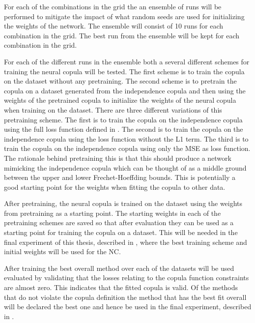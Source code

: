 For each of the combinations in the grid the an ensemble of runs will be performed to mitigate the impact of what random seeds are used for initializing the weights of the network. The ensemble will consist of 10 runs for each combination in the grid. The best run from the ensemble will be kept for each combination in the grid. 

For each of the different runs in the ensemble both a several different schemes for training the neural copula will be tested. The first scheme is to train the copula on the dataset without any pretraining. The second scheme is to pretrain the copula on a dataset generated from the independence copula and then using the weights of the pretrained copula to initialize the weights of the neural copula when training on the dataset. There are three different variations of this pretraining scheme. The first is to train the copula on the independence copula using the full loss function defined in . The second is to train the copula on the independence copula using the loss function without the L1 term. The third is to train the copula on the independence copula using only the MSE as loss function. The rationale behind pretraining this is that this should produce a network mimicking the independence copula which can be thought of as a middle ground between the upper and lower Frechet-Hoeffding bounds. This is potentially a good starting point for the weights when fitting the copula to other data.  

After pretraining, the neural copula is trained on the dataset using the weights from pretraining as a starting point. The starting weights in each of the pretraining schemes are saved so that after evaluation they can be used as a starting point for training the copula on a dataset. This will be needed in the final experiment of this thesis, described in , where the best training scheme and initial weights will be used for the \gls{NC}. 

After training the best overall method over each of the datasets will be used evaluated by validating that the losses relating to the copula function constraints are almost zero. This indicates that the fitted copula is valid. Of the methods that do not violate the copula definition the method that has the best fit overall will be declared the best one and hence be used in the final experiment, described in .  

